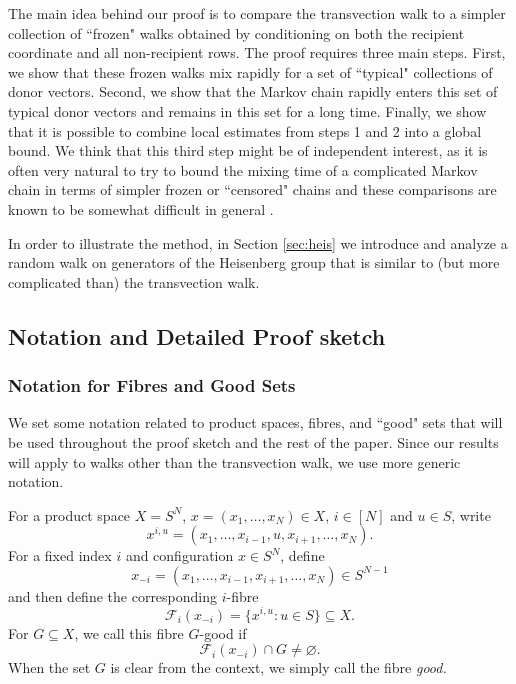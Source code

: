 \documentclass[11pt, reqno]{amsart}
\numberwithin{equation}{section}
\begin{document}
The main idea behind our proof is to compare the transvection walk to a simpler collection of ``frozen" walks obtained by conditioning on both the recipient coordinate and all non-recipient rows. The proof requires three main steps. First, we show that these frozen walks mix rapidly for a set of ``typical" collections of donor vectors. Second, we show that the Markov chain rapidly enters this set of typical donor vectors and remains in this set for a long time. Finally, we show that it is possible to combine local estimates from steps 1 and 2 into a global bound.  We think that this third step might be of independent interest, as it is often very natural to try to bound the mixing time of a complicated Markov chain in terms of simpler frozen or ``censored" chains and these comparisons are known to be somewhat difficult in general \cite{PeresWinkler2013Censoring,FillKahn2013Comparison}.

In order to illustrate the method, in Section \ref{sec:heis} we introduce and analyze a random walk on generators of the Heisenberg group that is similar to (but more complicated than) the transvection walk. 

\subsection{Notation and Detailed Proof sketch}\label{subsec:intro-proof-idea}

\subsubsection{Notation for Fibres and Good Sets} \label{SecFibreNotationFirstTime}

We set some notation related to product spaces, fibres, and ``good" sets that will be used throughout the proof sketch and the rest of the paper. Since our results will apply to walks other than the transvection walk, we use more generic notation.

For a product space \(X=S^N\), 
\(x=(x_1,\ldots,x_N)\in X\), \(i\in[N]\) and \(u\in S\), write
\[
x^{i,u}
=
(x_1,\ldots,x_{i-1},u,x_{i+1},\ldots,x_N).
\]
For a fixed index $i$ and configuration $x \in S^{N}$, define
\[
x_{-i}=(x_1,\ldots,x_{i-1},x_{i+1},\ldots,x_N)\in S^{N-1}
\]
and then define the corresponding \(i\)-fibre 
\[
\mathcal F_i(x_{-i})
=
\{x^{i,u}:u\in S\}\subseteq X.
\]
For \(G\subseteq X\), we call this fibre \(G\)-good if
\[
\mathcal F_i(x_{-i})\cap G\ne\varnothing.
\]
When the set $G$ is clear from the context, we simply call the fibre \textit{good.}
\end{document}
